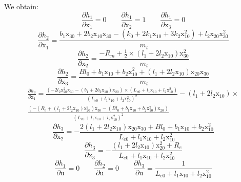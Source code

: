 We obtain:
\begin{equation*} 
\frac{\partial{h_{1}}}{\partial{\text{x}_{1}}} = 0 \qquad \frac{\partial{h_{1}}}{\partial{\text{x}_{2}}} = 1 \qquad \frac{\partial{h_{1}}}{\partial{\text{x}_{3}}} = 0
\end{equation*}
\begin{equation*}
\frac{\partial{h_{2}}}{\partial{\text{x}_{1}}} = \frac{b_{1}\text{x}_{30} + 2b_{2}\text{x}_{10}\text{x}_{30} - (k_{0}+2k_{1}\text{x}_{10}+3k_{2}\text{x}_{10}^2) + l_{2}\text{x}_{20}\text{x}_{30}^2}{m_{t}}
\end{equation*}
\begin{equation*}
\frac{\partial{h_{2}}}{\partial{\text{x}_{2}}} = \frac{-R_{m} + \frac{1}{2}\times (l_{1}+2l_{2}\text{x}_{10})\text{x}_{30}^2}{m_{t}}
\end{equation*}
\begin{equation*}
\frac{\partial{h_{2}}}{\partial{\text{x}_{3}}} = \frac{Bl_{0}+b_{1}\text{x}_{10}+b_{2}\text{x}_{10}^2+(l_{1}+2l_{2}\text{x}_{10})\text{x}_{20}\text{x}_{30}}{m_{t}}
\end{equation*}
\begin{multline*}
\frac{\partial{h_{3}}}{\partial{\text{x}_{1}}} = \frac{(-2l_{2}\text{x}_{20}^2\text{x}_{30}-(b_{1}+2b_{2}\text{x}_{10})\text{x}_{20}) \times (L_{e0}+l_1\text{x}_{10}+l_2\text{x}_{10}^2)}{(L_{e0}+l_1\text{x}_{10}+l_2\text{x}_{10}^2)^2} - (l_{1}+2l_{2}\text{x}_{10}) \times \\
\frac{(-(R_e+(l_1+2l_2\text{x}_{10})\text{x}_{20}^2)\text{x}_{30}-(Bl_0+b_1\text{x}_{10}+b_2\text{x}_{10}^2)\text{x}_{20})}{(L_{e0}+l_1\text{x}_{10}+l_2\text{x}_{10}^2)^2}
\end{multline*}
\begin{equation*}
\frac{\partial{h_{3}}}{\partial{\text{x}_{2}}} = - \frac{2(l_1+2l_2\text{x}_{10})\text{x}_{20}\text{x}_{30}+Bl_0+b_1\text{x}_{10}+b_2\text{x}_{10}^2}{L_{e0}+l_1\text{x}_{10}+l_2\text{x}_{10}^2}
\end{equation*}
\begin{equation*}
\frac{\partial{h_{3}}}{\partial{\text{x}_{3}}} = - \frac{(l_1+2l_2\text{x}_{10})\text{x}_{20}^2+R_{e}}{L_{e0}+l_1\text{x}_{10}+l_2\text{x}_{10}^2}
\end{equation*}
\begin{equation*}
\frac{\partial{h_{1}}}{\partial{\text{u}}} = 0 \qquad 
\frac{\partial{h_{2}}}{\partial{\text{u}}} = 0 \qquad
\frac{\partial{h_{3}}}{\partial{\text{u}}} = \frac{1}{L_{e0}+l_1\text{x}_{10}+l_2\text{x}_{10}^2}
\end{equation*}
